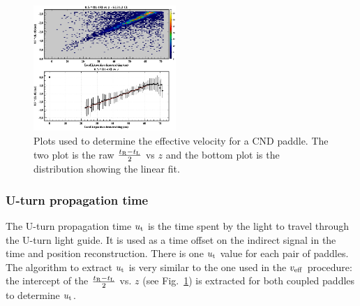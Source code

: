 \begin{figure}[htb]
\begin{center}
\includegraphics[width=0.48\textwidth]{Figure/veff.png} 
\end{center}
\caption{Plots used to determine the effective velocity for a CND paddle. The two plot is the raw $\frac{t_{\rm{R}}-t_{\rm{L}}}{2}$ vs $z$ and the bottom plot is the distribution showing the linear fit.}
\label{effv}
\end{figure}

\subsubsection{U-turn propagation time}

The U-turn propagation time $u_{\rm{t}}$ is the time spent by the light to travel through the U-turn light guide. It is used as a time offset on the indirect signal in the time and position reconstruction. There is one $u_{\rm{t}}$ value for each pair of paddles.
The algorithm to extract $u_{\rm{t}}$ is very similar to the one used in the $v_{\rm{eff}}$ procedure: the intercept of the $\frac{t_{\rm{R}}-t_{\rm{L}}}{2}$ vs. $z$ (see Fig.~\ref{effv}) is extracted for both coupled paddles to determine $u_{\rm{t}}$.

